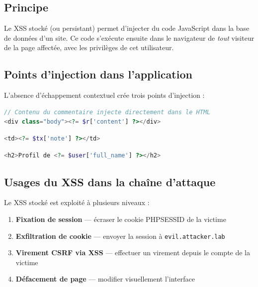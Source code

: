 \documentclass[12pt,a4paper]{report}
\begin{document}
\subsection{Principe}

Le XSS stocké (ou persistant) permet d'injecter du code JavaScript dans la base de données d'un site. Ce code s'exécute ensuite dans le navigateur de \emph{tout} visiteur de la page affectée, avec les privilèges de cet utilisateur.

\subsection{Points d'injection dans l'application}

L'absence d'échappement contextuel crée trois points d'injection :

\begin{lstlisting}[language=PHP, caption={comments.php vulnérable — absence de htmlspecialchars}]
// Contenu du commentaire injecte directement dans le HTML
<div class="body"><?= $r['content'] ?></div>
\end{lstlisting}

\begin{lstlisting}[language=PHP, caption={dashboard.php vulnérable — note de virement}]
<td><?= $tx['note'] ?></td>
\end{lstlisting}

\begin{lstlisting}[language=PHP, caption={profile.php vulnérable — nom complet}]
<h2>Profil de <?= $user['full_name'] ?></h2>
\end{lstlisting}

\subsection{Usages du XSS dans la chaîne d'attaque}

Le XSS stocké est exploité à plusieurs niveaux :

\begin{enumerate}
  \item \textbf{Fixation de session} — écraser le cookie PHPSESSID de la victime
  \item \textbf{Exfiltration de cookie} — envoyer la session à \texttt{evil.attacker.lab}
  \item \textbf{Virement CSRF via XSS} — effectuer un virement depuis le compte de la victime
  \item \textbf{Défacement de page} — modifier visuellement l'interface
\end{enumerate}
\end{document}
